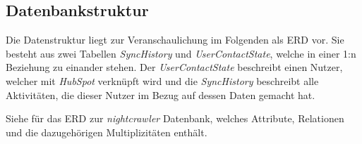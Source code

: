 \subsection{Datenbankstruktur}
\label{sec:Datenbankstruktur}
Die Datenstruktur liegt zur Veranschaulichung im Folgenden als \acs{ERD} vor. Sie besteht aus zwei Tabellen \textit{SyncHistory} und \textit{UserContactState}, 
welche in einer 1:n Beziehung zu einander stehen. Der \textit{UserContactState} beschreibt einen Nutzer, welcher mit \textit{HubSpot} verknüpft wird und die 
\textit{SyncHistory} beschreibt alle Aktivitäten, die dieser Nutzer im Bezug auf dessen Daten gemacht hat.
\par\smallskip
Siehe  für das \ac{ERD} zur \textit{nightcrawler} Datenbank, welches Attribute, Relationen und die dazugehörigen Multiplizitäten enthält. 

